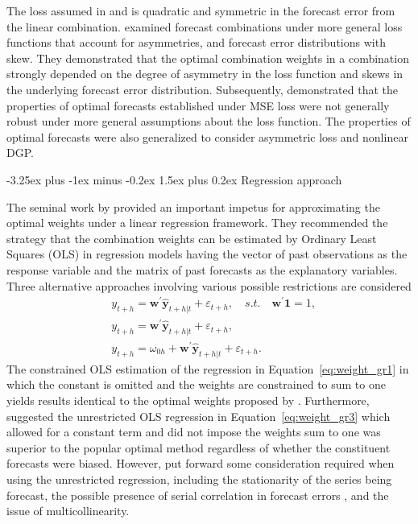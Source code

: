 \documentclass[11pt]{article}
\makeatletter
\renewcommand{\paragraph}{\@startsection{paragraph}{4}{0ex}%
   {-3.25ex plus -1ex minus -0.2ex}%
   {1.5ex plus 0.2ex}%
   {\normalfont\normalsize\bfseries}}
\makeatother
\begin{document}
The loss assumed in \cite{Bates1969-yj} and \cite{Newbold1974-lp} is quadratic and symmetric in the forecast error from the linear combination. \cite{Elliott2004-dz} examined forecast combinations under more general loss functions that account for asymmetries, and forecast error distributions with skew. They demonstrated that the optimal combination weights in a combination strongly depended on the degree of asymmetry in the loss function and skews in the underlying forecast error distribution. Subsequently, \cite{Patton2007-zo} demonstrated that the properties of optimal forecasts established under MSE loss were not generally robust under more general assumptions about the loss function. The properties of optimal forecasts were also generalized to consider asymmetric loss and nonlinear DGP.

\paragraph{Regression approach}

The seminal work by \cite{Granger1984-jc} provided an important impetus for approximating the optimal weights under a linear regression framework. They recommended the strategy that the combination weights can be estimated by Ordinary Least Squares (OLS) in regression models having the vector of past observations as the response variable and the matrix of past forecasts as the explanatory variables. Three alternative approaches involving various possible restrictions are considered
\begin{align}
&y_{t+h}=\boldsymbol{w}^{\prime} \hat{\mathbf{y}}_{t+h|t}+\varepsilon_{t+h}, \quad s.t. \quad \boldsymbol{w}^{\prime}\mathbf{1}=1, \label{eq:weight_gr1}\\
&y_{t+h}=\boldsymbol{w}^{\prime} \hat{\mathbf{y}}_{t+h|t}+\varepsilon_{t+h}, \nonumber\\
&y_{t+h}=\omega_{0h}+\boldsymbol{w}^{\prime} \hat{\mathbf{y}}_{t+h|t}+\varepsilon_{t+h}. \label{eq:weight_gr3}
\end{align}
The constrained OLS estimation of the regression in Equation~\eqref{eq:weight_gr1} in which the constant is omitted and the weights are constrained to sum to one yields results identical to the optimal weights proposed by \cite{Bates1969-yj}. Furthermore, \cite{Granger1984-jc} suggested the unrestricted OLS regression in Equation~\eqref{eq:weight_gr3} which allowed for a constant term and did not impose the weights sum to one was superior to the popular optimal method regardless of whether the constituent forecasts were biased. However, \cite{De_Menezes2000-vd} put forward some consideration required when using the unrestricted regression, including the stationarity of the series being forecast, the possible presence of serial correlation in forecast errors \citep[see also][]{Diebold1988-sx,Edward_Coulson1993-db}, and the issue of multicollinearity.
\end{document}
